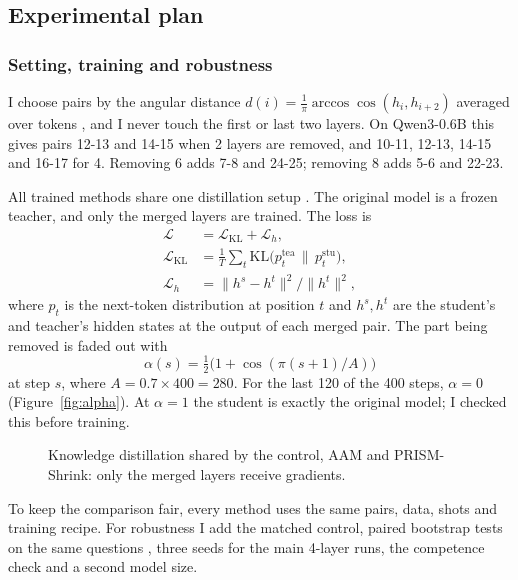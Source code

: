 \documentclass[11pt]{article}
\begin{document}
\subsection{Experimental plan}

\subsubsection{Setting, training and robustness}

I choose pairs by the angular distance $d(i) = \frac{1}{\pi}\arccos\cos(h_i, h_{i+2})$ averaged over tokens
\citep{gromov2024}, and I never touch the first or last two layers. On Qwen3-0.6B this gives pairs 12-13 and 14-15
when 2 layers are removed, and 10-11, 12-13, 14-15 and 16-17 for 4. Removing 6 adds 7-8 and 24-25; removing 8 adds
5-6 and 22-23.

All trained methods share one distillation setup \citep{hinton2015}. The original model is a frozen teacher, and only
the merged layers are trained. The loss is
\begin{align}
\mathcal{L} &= \mathcal{L}_{\mathrm{KL}} + \mathcal{L}_{h}, \\
\mathcal{L}_{\mathrm{KL}} &= \tfrac{1}{T}\textstyle\sum_t \mathrm{KL}\big(p^{\mathrm{tea}}_t \,\|\, p^{\mathrm{stu}}_t\big), \\
\mathcal{L}_{h} &= \lVert h^{s}-h^{t}\rVert^2 / \lVert h^{t}\rVert^2 ,
\end{align}
where $p_t$ is the next-token distribution at position $t$ and $h^{s}, h^{t}$ are the student's and teacher's
hidden states at the output of each merged pair. The part being removed is faded out with
\begin{equation}
\alpha(s) = \tfrac{1}{2}\big(1+\cos(\pi (s+1)/A)\big)
\end{equation}
at step $s$, where $A = 0.7\times 400 = 280$. For the last 120 of the 400 steps, $\alpha=0$
(Figure~\ref{fig:alpha}). At $\alpha=1$ the student is exactly the original model; I checked this before training.

\begin{figure}[t]
\centering

\caption{Knowledge distillation shared by the control, AAM and PRISM-Shrink: only the merged layers receive gradients.}
\label{fig:distill}
\end{figure}

To keep the comparison fair, every method uses the same pairs, data, shots and training recipe. For robustness I add
the matched control, paired bootstrap tests on the same questions \citep{efron1993}, three seeds for the main 4-layer
runs, the competence check and a second model size.
\end{document}
